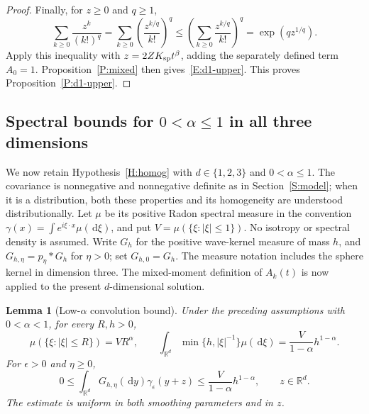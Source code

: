 \documentclass[12pt]{article}
\numberwithin{equation}{section}
\newtheorem{lemma}[theorem]{Lemma}
\theoremstyle{definition}
\newcommand{\R}{\mathbb{R}}
\newcommand{\ud}{\,\mathrm{d}}
\begin{document}
\begin{proof}
  Finally, for $z\ge0$ and $q\ge1$,
  \[
    \sum_{k\ge0}\frac{z^k}{(k!)^q}
    =\sum_{k\ge0}\left(\frac{z^{k/q}}{k!}\right)^q
    \le\left(\sum_{k\ge0}\frac{z^{k/q}}{k!}\right)^q
    =\exp(qz^{1/q}).
  \]
  Apply this inequality with $z=2ZK_{\rm sp}t^\beta$, adding the
  separately defined term $A_0=1$. Proposition~\ref{P:mixed} then
  gives~\eqref{E:d1-upper}. This proves Proposition~\ref{P:d1-upper}.
\end{proof}

\subsection{Spectral bounds for $0<\alpha\le1$ in all three dimensions}

We now retain Hypothesis~\ref{H:homog} with $d\in\{1,2,3\}$ and
$0<\alpha\le1$. The covariance is nonnegative and nonnegative definite
as in Section~\ref{S:model}; when it is a distribution, both these
properties and its homogeneity are understood distributionally.
Let $\mu$ be its positive Radon spectral measure in the convention
$\gamma(x)=\int e^{i\xi\cdot x}\mu(\ud\xi)$, and put
$V=\mu(\{\xi:|\xi|\le1\})$. No isotropy or spectral density is assumed.
Write $G_h$ for the positive wave-kernel measure of mass $h$, and
$G_{h,\eta}=p_\eta*G_h$ for $\eta>0$; set $G_{h,0}=G_h$.
The measure notation includes the sphere kernel in dimension three.
The mixed-moment definition of $A_k(t)$ is now applied to the present
$d$-dimensional solution.

\begin{lemma}[Low-$\alpha$ convolution bound]\label{L:low-alpha-convolution}
  Under the preceding assumptions with $0<\alpha<1$, for every $R,h>0$,
  \begin{equation}\label{E:low-alpha-radial}
    \mu(\{\xi:|\xi|\le R\})=VR^\alpha,\qquad
    \int_{\R^d}\min\{h,|\xi|^{-1}\}\mu(\ud\xi)
    =\frac{V}{1-\alpha}h^{1-\alpha}.
  \end{equation}
  For $\epsilon>0$ and $\eta\ge0$,
  \begin{equation}\label{E:low-alpha-convolution}
    0\le\int_{\R^d}G_{h,\eta}(\ud y)\gamma_\epsilon(y+z)
    \le\frac{V}{1-\alpha}h^{1-\alpha},
    \qquad z\in\R^d.
  \end{equation}
  The estimate is uniform in both smoothing parameters and in $z$.
\end{lemma}
\end{document}
